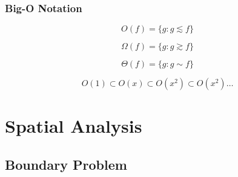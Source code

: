 \subsubsection{Big-O Notation}\label{sec:bigo_notation}

\[
    O(f) = \{ g : g \lesssim f \}
\]

\[
    \Omega(f) = \{ g : g \gtrsim f \}
\]

\[
    \Theta(f) = \{ g : g \sim f \}
\]

\[
    O(1) \subset O(x) \subset O(x^2) \subset O(x^2) \ldots
\]



\section{Spatial Analysis}\label{sec:spatial_analysis}


\subsection{Boundary Problem}\label{sec:boundary_problem}

